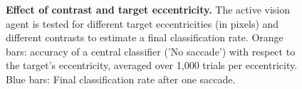\begin{figure}[t!]%
	\caption{
		{\bf Effect of contrast and target eccentricity.} %
		The active vision agent is tested for different target eccentricities (in pixels) and different contrasts to estimate a final classification rate. Orange bars: accuracy of a central classifier ('No saccade') with respect to the target's eccentricity, averaged over 1,000 trials per eccentricity. Blue bars: Final classification rate after one saccade. %
		\label{fig:results}}%
\end{figure}%




